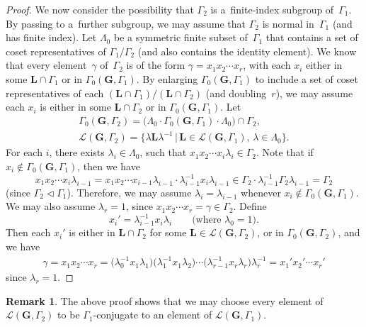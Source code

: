 \documentclass[11pt]{article}
\numberwithin{equation}{section}
\newcommand{\Ga}{\mathbf{G}}
\newcommand{\La}{\mathbf{L}}
\newcommand{\subgroups}{\mathcal{L}}
\numberwithin{equation}{section}
\theoremstyle{definition}
\newtheorem{rem}[thm]{Remark}
\begin{document}
\begin{proof}
We now consider the possibility that $\Gamma_2$ is a~finite-index subgroup of~$\Gamma_1$. By passing to a~further subgroup, we may assume that $\Gamma_2$ is normal in~$\Gamma_1$ (and has finite index).
Let $\Lambda_0$ be a symmetric finite subset of~$\Gamma_1$ that contains a set of coset representatives of $\Gamma_1/\Gamma_2$ (and also contains the identity element). We know that every element~$\gamma$ of~$\Gamma_2$ is of the form $\gamma = x_1 x_2 \cdots x_r$, with each $x_i$ either in some $\La \cap \Gamma_1$ or in $\Gamma_0(\Ga,\Gamma_1)$. By enlarging $\Gamma_0(\Ga,\Gamma_1)$ to include a set of coset representatives of each $(\La \cap \Gamma_1)/(\La \cap \Gamma_2)$ (and doubling~$r$), we may assume each $x_i$ is either in some $\La \cap \Gamma_2$ or in $\Gamma_0(\Ga,\Gamma_1)$.
Let
\begin{gather*}
\Gamma_0(\Ga,\Gamma_2) = \bigl( \Lambda_0 \cdot \Gamma_0(\Ga,\Gamma_1) \cdot \Lambda_0 \bigr) \cap \Gamma_2,\\
\subgroups(\Ga,\Gamma_2) = \big\{ \lambda \La \lambda^{-1} \,|\, \La \in \subgroups(\Ga,\Gamma_1), \, \lambda \in \Lambda_0 \big\} .
\end{gather*}
For each $i$, there exists $\lambda_i \in \Lambda_0$, such that $x_1 x_2 \cdots x_i \lambda_i \in \Gamma_2$. Note that if $x_i \notin \Gamma_0(\Ga,\Gamma_1)$, then we have
	\[ x_1 x_2 \cdots x_i \lambda_{i-1}
	= x_1 x_2 \cdots x_{i-1} \lambda_{i-1} \cdot \lambda_{i-1}^{-1} x_i \lambda_{i-1}
	\in \Gamma_2 \cdot \lambda_{i-1}^{-1} \Gamma_2 \lambda_{i-1}
	= \Gamma_2
	\]
(since $\Gamma_2 \triangleleft \Gamma_1$). Therefore, we may assume $\lambda_i = \lambda_{i-1}$ whenever $x_i \notin \Gamma_0(\Ga,\Gamma_1)$. We may also assume $\lambda_r = 1$, since $x_1 x_2 \cdots x_r = \gamma \in \Gamma_2$.
Define
	\[ x_i' = \lambda_{i-1}^{-1} x_i \lambda_i
	\qquad \text{(where $\lambda_0 = 1$)} .\]
Then each $x_i'$ is either in $\La \cap \Gamma_2$ for some $\La \in \subgroups(\Ga,\Gamma_2)$, or in $\Gamma_0(\Ga,\Gamma_2)$,
	and we have
		\begin{gather*}
		\gamma
		 = x_1 x_2 \cdots x_r
		= \big(\lambda_0^{-1} x_1 \lambda_1\big) \big(\lambda_1^{-1} x_1 \lambda_2\big)
		\cdots \big(\lambda_{r-1}^{-1} x_r \lambda_r\big) \lambda_r^{-1}
		= x_1' x_2' \cdots x_r'
		 \end{gather*}
since $\lambda_r = 1$.
\end{proof}

\begin{rem}The above proof shows that we may choose every element of $\subgroups(\Ga,\Gamma_2)$ to be $\Gamma_1$-conjugate to an element of $\subgroups(\Ga,\Gamma_1)$.
\end{rem}
\end{document}
